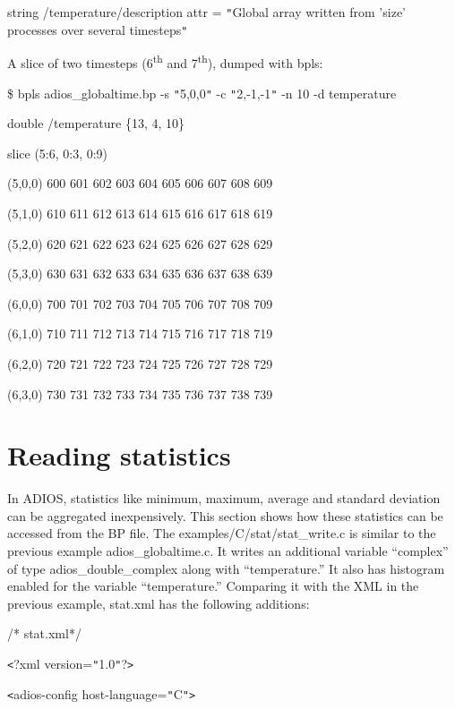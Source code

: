 string     /temperature/description  attr   = \texttt{"}Global array written from 
'size' processes over several timesteps\texttt{"}\label{HToc84890304}\label{HToc212016679}\label{HToc212016921}

\parindent=0pt
A slice of two timesteps (6\textsuperscript{th} and 7\textsuperscript{th}), dumped 
with bpls:

\$ bpls adios\_globaltime.bp -s \texttt{"}5,0,0\texttt{"} -c \texttt{"}2,-1,-1\texttt{"} 
-n 10 -d temperature

\parindent=7pt
double     /temperature  \{13, 4, 10\}

\parindent=14pt
slice (5:6, 0:3, 0:9)

\parindent=0pt
(5,0,0)    600 601 602 603 604 605 606 607 608 609

\parindent=14pt
(5,1,0)    610 611 612 613 614 615 616 617 618 619

(5,2,0)    620 621 622 623 624 625 626 627 628 629

\parindent=28pt
(5,3,0)    630 631 632 633 634 635 636 637 638 639

\parindent=14pt
(6,0,0)    700 701 702 703 704 705 706 707 708 709

(6,1,0)    710 711 712 713 714 715 716 717 718 719

\parindent=28pt
(6,2,0)    720 721 722 723 724 725 726 727 728 729

\parindent=14pt
(6,3,0)    730 731 732 733 734 735 736 737 738 739 \label{HToc182553451}

\section{Reading statistics}

\parindent=0pt
In ADIOS, statistics like minimum, maximum, average and standard deviation can 
be aggregated inexpensively. This section shows how these statistics can be accessed 
from the BP file. The examples/C/stat/stat\_write.c is similar to the previous 
example adios\_globaltime.c. It writes an additional variable ``complex'' of type 
adios\_double\_complex along with ``temperature.''  It also has histogram enabled 
for the variable ``temperature.''  Comparing it with the XML in the previous example, 
stat.xml has the following additions:

/* stat.xml*/

\texttt{<}?xml version=\texttt{"}1.0\texttt{"}?\texttt{>}

\texttt{<}adios-config host-language=\texttt{"}C\texttt{"}\texttt{>}

